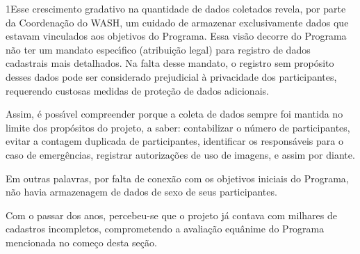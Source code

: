 \documentclass[
12pt,		%
openright,	%
twoside,  %
a4paper,			%
chapter=TITLE,		%
english,			%
french,				%
spanish,			%
brazil				%
]{USPSC-classe/USPSC}
\begin{document}
1Esse crescimento gradativo na quantidade de dados coletados revela, por parte da Coordena\c{c}\~ao do WASH, um cuidado de armazenar exclusivamente dados que estavam vinculados aos objetivos do Programa. Essa vis\~ao decorre do Programa n\~ao ter um mandato espec\'{\i}fico (atribui\c{c}\~ao legal) para registro de dados cadastrais mais detalhados. Na falta desse mandato, o registro sem prop\'osito desses dados pode ser considerado prejudicial \`a privacidade dos participantes, requerendo custosas medidas de prote\c{c}\~ao de dados adicionais.

















Assim, \'e poss\'{\i}vel compreender porque a coleta de dados sempre foi mantida no limite dos prop\'ositos do projeto, a saber: contabilizar o n\'umero de participantes, evitar a contagem duplicada de participantes, identificar os respons\'aveis para o caso de emerg\^encias, registrar autoriza\c{c}\~oes de uso de imagens, e assim por diante.

















Em outras palavras, por falta de conex\~ao com os objetivos iniciais do Programa, n\~ao havia armazenagem de dados de sexo de seus participantes.

















Com o passar dos anos, percebeu-se que o projeto j\'a contava com milhares de cadastros incompletos, comprometendo a avalia\c{c}\~ao equ\^anime do Programa mencionada no come\c{c}o desta se\c{c}\~ao.
\end{document}
